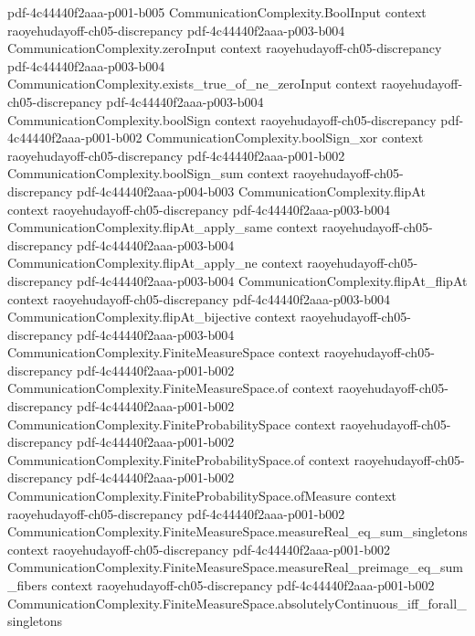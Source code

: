 \begin{lemma}
  {pdf-4c44440f2aaa-p001-b005}
\proofstep
  {CommunicationComplexity.BoolInput}
  {context}
  {raoyehudayoff-ch05-discrepancy}
  {pdf-4c44440f2aaa-p003-b004}
\proofstep
  {CommunicationComplexity.zeroInput}
  {context}
  {raoyehudayoff-ch05-discrepancy}
  {pdf-4c44440f2aaa-p003-b004}
\proofstep
  {CommunicationComplexity.exists_true_of_ne_zeroInput}
  {context}
  {raoyehudayoff-ch05-discrepancy}
  {pdf-4c44440f2aaa-p003-b004}
\proofstep
  {CommunicationComplexity.boolSign}
  {context}
  {raoyehudayoff-ch05-discrepancy}
  {pdf-4c44440f2aaa-p001-b002}
\proofstep
  {CommunicationComplexity.boolSign_xor}
  {context}
  {raoyehudayoff-ch05-discrepancy}
  {pdf-4c44440f2aaa-p001-b002}
\proofstep
  {CommunicationComplexity.boolSign_sum}
  {context}
  {raoyehudayoff-ch05-discrepancy}
  {pdf-4c44440f2aaa-p004-b003}
\proofstep
  {CommunicationComplexity.flipAt}
  {context}
  {raoyehudayoff-ch05-discrepancy}
  {pdf-4c44440f2aaa-p003-b004}
\proofstep
  {CommunicationComplexity.flipAt_apply_same}
  {context}
  {raoyehudayoff-ch05-discrepancy}
  {pdf-4c44440f2aaa-p003-b004}
\proofstep
  {CommunicationComplexity.flipAt_apply_ne}
  {context}
  {raoyehudayoff-ch05-discrepancy}
  {pdf-4c44440f2aaa-p003-b004}
\proofstep
  {CommunicationComplexity.flipAt_flipAt}
  {context}
  {raoyehudayoff-ch05-discrepancy}
  {pdf-4c44440f2aaa-p003-b004}
\proofstep
  {CommunicationComplexity.flipAt_bijective}
  {context}
  {raoyehudayoff-ch05-discrepancy}
  {pdf-4c44440f2aaa-p003-b004}
\proofstep
  {CommunicationComplexity.FiniteMeasureSpace}
  {context}
  {raoyehudayoff-ch05-discrepancy}
  {pdf-4c44440f2aaa-p001-b002}
\proofstep
  {CommunicationComplexity.FiniteMeasureSpace.of}
  {context}
  {raoyehudayoff-ch05-discrepancy}
  {pdf-4c44440f2aaa-p001-b002}
\proofstep
  {CommunicationComplexity.FiniteProbabilitySpace}
  {context}
  {raoyehudayoff-ch05-discrepancy}
  {pdf-4c44440f2aaa-p001-b002}
\proofstep
  {CommunicationComplexity.FiniteProbabilitySpace.of}
  {context}
  {raoyehudayoff-ch05-discrepancy}
  {pdf-4c44440f2aaa-p001-b002}
\proofstep
  {CommunicationComplexity.FiniteProbabilitySpace.ofMeasure}
  {context}
  {raoyehudayoff-ch05-discrepancy}
  {pdf-4c44440f2aaa-p001-b002}
\proofstep
  {CommunicationComplexity.FiniteMeasureSpace.measureReal_eq_sum_singletons}
  {context}
  {raoyehudayoff-ch05-discrepancy}
  {pdf-4c44440f2aaa-p001-b002}
\proofstep
  {CommunicationComplexity.FiniteMeasureSpace.measureReal_preimage_eq_sum_fibers}
  {context}
  {raoyehudayoff-ch05-discrepancy}
  {pdf-4c44440f2aaa-p001-b002}
\proofstep
  {CommunicationComplexity.FiniteMeasureSpace.absolutelyContinuous_iff_forall_singletons}

\end{lemma}
